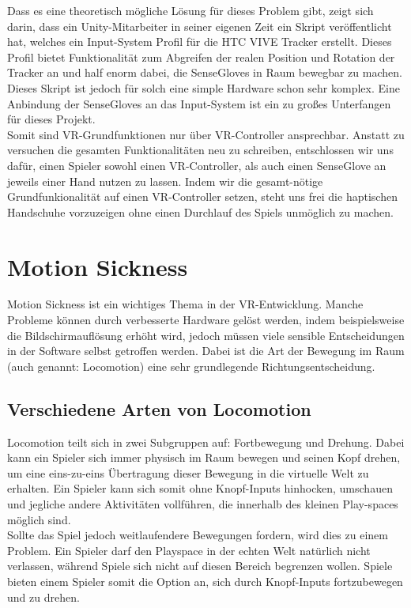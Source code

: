 Dass es eine theoretisch mögliche Lösung für dieses Problem gibt, zeigt sich darin, dass ein Unity-Mitarbeiter in seiner eigenen Zeit ein Skript veröffentlicht hat, welches ein Input-System Profil für die HTC VIVE Tracker erstellt. Dieses Profil bietet Funktionalität zum Abgreifen der realen Position und Rotation der Tracker an und half enorm dabei, die SenseGloves in Raum bewegbar zu machen. Dieses Skript ist jedoch für solch eine simple Hardware schon sehr komplex. Eine Anbindung der SenseGloves an das Input-System ist ein zu großes Unterfangen für dieses Projekt. \\

Somit sind VR-Grundfunktionen nur über VR-Controller ansprechbar. Anstatt zu versuchen die gesamten Funktionalitäten neu zu schreiben, entschlossen wir uns dafür, einen Spieler sowohl einen VR-Controller, als auch einen SenseGlove an jeweils einer Hand nutzen zu lassen. Indem wir die gesamt-nötige Grundfunkionalität auf einen VR-Controller setzen, steht uns frei die haptischen Handschuhe vorzuzeigen ohne einen Durchlauf des Spiels unmöglich zu machen.


\section{Motion Sickness}
Motion Sickness ist ein wichtiges Thema in der VR-Entwicklung. Manche Probleme können durch verbesserte Hardware gelöst werden, indem beispielsweise die Bildschirmauflösung erhöht wird, jedoch müssen viele sensible Entscheidungen in der Software selbst getroffen werden. Dabei ist die Art der Bewegung im Raum (auch genannt: \dq Locomotion\dq) eine sehr grundlegende Richtungsentscheidung.

\subsection{Verschiedene Arten von Locomotion}
Locomotion teilt sich in zwei Subgruppen auf: Fortbewegung und Drehung. Dabei kann ein Spieler sich immer physisch im Raum bewegen und seinen Kopf drehen, um eine eins-zu-eins Übertragung dieser Bewegung in die virtuelle Welt zu erhalten. Ein Spieler kann sich somit ohne Knopf-Inputs hinhocken, umschauen und jegliche andere Aktivitäten vollführen, die innerhalb des kleinen Play-spaces möglich sind.\\

Sollte das Spiel jedoch weitlaufendere Bewegungen fordern, wird dies zu einem Problem. Ein Spieler darf den Playspace in der echten Welt natürlich nicht verlassen, während Spiele sich nicht auf diesen Bereich begrenzen wollen. Spiele bieten einem Spieler somit die Option an, sich durch Knopf-Inputs fortzubewegen und zu drehen.

